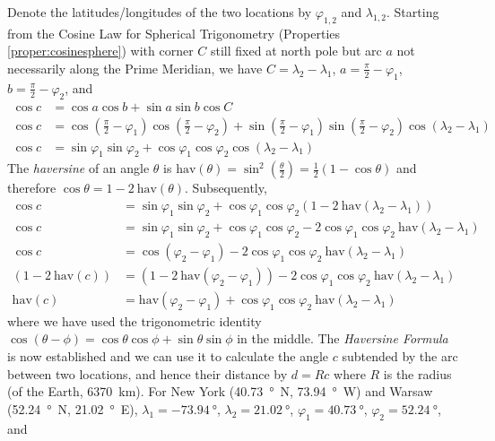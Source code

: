 \begin{solution}
Denote the latitudes/longitudes of the two locations by $\varphi_{1,2}$ and $\lambda_{1,2}$. Starting from the Cosine Law for Spherical Trigonometry (Properties \ref{proper:cosinesphere}) with corner $C$ still fixed at north pole but arc $a$ not necessarily along the Prime Meridian, we have $C = \lambda_2 - \lambda_1$, $a = \frac{\pi}{2} - \varphi_1$, $b = \frac{\pi}{2} - \varphi_2$, and
\begin{align*}
\cos c &= \cos a \cos b + \sin a \sin b \cos C \\
\cos c &= \cos (\frac{\pi}{2} - \varphi_1) \cos (\frac{\pi}{2} - \varphi_2) + \sin (\frac{\pi}{2} - \varphi_1) \sin (\frac{\pi}{2} - \varphi_2) \cos (\lambda_2 - \lambda_1) \\
\cos c &= \sin \varphi_1 \sin \varphi_2 + \cos \varphi_1 \cos \varphi_2 \cos (\lambda_2 - \lambda_1)
\end{align*}
The \textit{haversine} of an angle $\theta$ is $\text{hav}(\theta) = \sin^2 (\frac{\theta}{2}) = \frac{1}{2}(1-\cos\theta)$ and therefore $\cos\theta = 1 - 2\ \text{hav}(\theta)$. Subsequently,
\begin{align}
\cos c &= \sin \varphi_1 \sin \varphi_2 + \cos \varphi_1 \cos \varphi_2 (1 - 2\ \text{hav}(\lambda_2 - \lambda_1)) \nonumber \\ 
\cos c &= \sin \varphi_1 \sin \varphi_2 + \cos \varphi_1 \cos \varphi_2 - 2 \cos \varphi_1 \cos \varphi_2\ \text{hav}(\lambda_2 - \lambda_1) \nonumber \\
\cos c &= \cos(\varphi_2 - \varphi_1) - 2 \cos \varphi_1 \cos \varphi_2\ \text{hav}(\lambda_2 - \lambda_1) \nonumber \\
(1 - 2\ \text{hav}(c)) &= (1 - 2\ \text{hav}(\varphi_2 - \varphi_1)) - 2 \cos \varphi_1 \cos \varphi_2\ \text{hav}(\lambda_2 - \lambda_1) \nonumber \\
\text{hav}(c) &= \text{hav}(\varphi_2 - \varphi_1) + \cos \varphi_1 \cos \varphi_2\ \text{hav}(\lambda_2 - \lambda_1)
\end{align}
where we have used the trigonometric identity $\cos(\theta-\phi) = \cos \theta \cos \phi + \sin \theta \sin \phi$ in the middle. The \textit{Haversine Formula} is now established and we can use it to calculate the angle $c$ subtended by the arc between two locations, and hence their distance by $d = Rc$ where $R$ is the radius (of the Earth, \SI{6370}{\km}). For New York (\SI{40.73}{\degree N}, \SI{73.94}{\degree W}) and Warsaw (\SI{52.24}{\degree N}, \SI{21.02}{\degree E}), $\lambda_1 = \SI{-73.94}{\degree}$, $\lambda_2 = \SI{21.02}{\degree}$, $\varphi_1 = \SI{40.73}{\degree}$, $\varphi_2 = \SI{52.24}{\degree}$, and

\end{solution}
